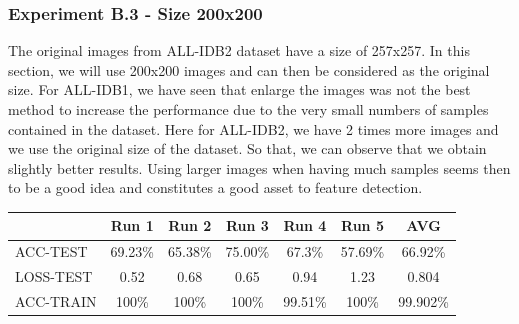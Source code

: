 \documentclass[11pt, openany]{report}
\theoremstyle{plain}
\theoremstyle{definition}
\theoremstyle{remark}
\begin{document}
\newpage
\subsubsection{Experiment B.3 - Size 200x200}
The original images from ALL-IDB2 dataset have a size of 257x257. In this section, we will use 200x200 images and can then be considered as the original size. For ALL-IDB1, we have seen that enlarge the images was not the best method to increase the performance due to the very small numbers of samples contained in the dataset. Here for ALL-IDB2, we have 2 times more images and we use the original size of the dataset. So that, we can observe that we obtain slightly better results. Using larger images when having much samples seems then to be a good idea and constitutes a good asset to feature detection.    


\begin{center}
\begin{tabular}{|l|c|c|c|c|c|c|}
  \hline
   & \textbf{Run 1} & \textbf{Run 2} & \textbf{Run 3} & \textbf{Run 4} & \textbf{Run 5} & \textbf{AVG}\\
  \hline
  ACC-TEST & 69.23\% & 65.38\% & 75.00\% & 67.3\% & 57.69\% & 66.92\%\\
  LOSS-TEST & 0.52 & 0.68 & 0.65 & 0.94  & 1.23 & 0.804 \\ 
  ACC-TRAIN & 100\% & 100\% & 100\% & 99.51\% & 100\% & 99.902\% \\ 
  \hline
\end{tabular}
\label{table:results-B3}
\end{center}
\end{document}
